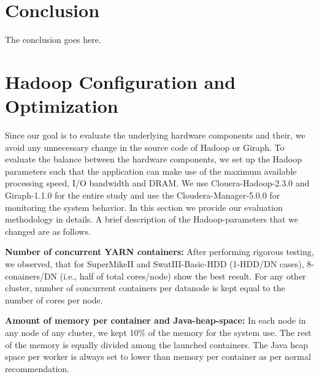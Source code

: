 \documentclass[journal]{IEEEtran}
\begin{document}




\section{Conclusion}
The conclusion goes here.




\appendices
\section{Hadoop Configuration and Optimization}
 \label{app:HadoopConfigurationsAndoptimizations}
Since our goal is to evaluate the underlying hardware components and their, we avoid any unnecessary change in the source code of Hadoop or Giraph. To evaluate the balance between the hardware components, we set up the Hadoop parameters such that the application can make use of the maximum available processing speed, I/O bandwidth and DRAM. We use Clouera-Hadoop-2.3.0 and Giraph-1.1.0 for the entire study and use the Cloudera-Manager-5.0.0 for monitoring the system behavior. In this section we provide our evaluation methodology in details. A brief description of the Hadoop-parameters that we changed are as follows. 
  
\textbf{Number of concurrent YARN containers:} After performing rigorous testing,  we observed, that for SuperMikeII and SwatIII-Basic-HDD (1-HDD/DN cases), 8-conainers/DN (i.e., half of total cores/node) show the best result. For any other cluster, number of concurrent containers per datanode is kept equal to the number of cores per node. 

\textbf{Amount of memory per container and Java-heap-space:} In each node in any node of any cluster, we kept 10\% of the memory for the system use. The rest of the memory is equally divided among the launched containers. The Java heap space per worker is always set to lower than memory per container as per normal recommendation.
\end{document}
